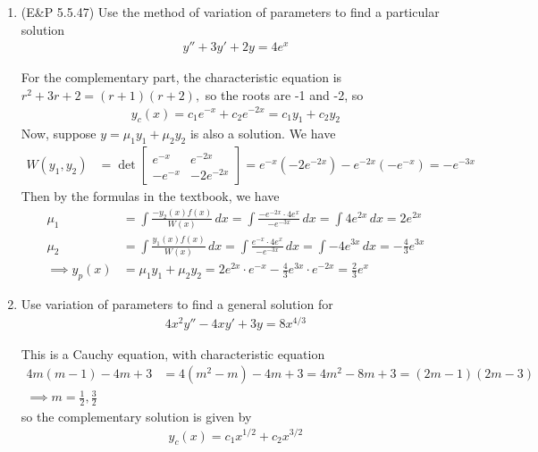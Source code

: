 \documentclass{article}
\begin{document}
\begin{enumerate}
	\item (E\&P 5.5.47) Use the method of variation of parameters to find a particular solution
		\begin{align*}
			y'' + 3y' + 2y = 4e^x
		\end{align*}
		\begin{soln}
			For the complementary part, the characteristic equation is $r^2+3r+2=(r+1)(r+2),$ so the roots are -1 and -2, so
			\begin{align*}
				y_c(x) = c_1e^{-x} + c_2e^{-2x} = c_1y_1 + c_2y_2
			\end{align*}
			Now, suppose $y = \mu_1y_1 + \mu_2y_2$ is also a solution. We have
			\begin{align*}
				W(y_1, y_2) &= \det \begin{bmatrix}
					e^{-x} & e^{-2x} \\ -e^{-x} & -2e^{-2x}
				\end{bmatrix} = e^{-x}(-2e^{-2x}) - e^{-2x}(-e^{-x}) = -e^{-3x}
			\end{align*}
			Then by the formulas in the textbook, we have
			\begin{align*}
				\mu_1 &= \int \frac{-y_2(x) f(x)}{W(x)}\, dx = \int \frac{-e^{-2x} \cdot 4e^x}{-e^{-3x}}\, dx = \int 4e^{2x}\, dx = 2e^{2x} \\
				\mu_2 &= \int \frac{y_1(x)f(x)}{W(x)}\, dx = \int \frac{e^{-x}\cdot 4e^{x}}{-e^{-3x}}\, dx = \int -4e^{3x}\, dx = -\frac{4}{3} e^{3x} \\
				\implies y_p(x) &= \mu_1 y_1 + \mu_2y_2 = 2e^{2x} \cdot e^{-x} - \frac{4}{3}e^{3x}\cdot e^{-2x} = \frac{2}{3} e^x
			\end{align*}
		\end{soln}

	\item Use variation of parameters to find a general solution for
		\begin{align*}
			4x^2y''-4xy'+3y=8x^{4/3}
		\end{align*}
		\begin{soln}
			This is a Cauchy equation, with characteristic equation
			\begin{align*}
				4m(m-1) - 4m + 3 &= 4(m^2-m) - 4m + 3 = 4m^2-8m+3 = (2m-1)(2m-3) \\
				\implies m = \frac{1}{2}, \frac{3}{2}
			\end{align*}
			so the complementary solution is given by
			\begin{align*}
				y_c(x) = c_1x^{1/2} + c_2x^{3/2}
			\end{align*}


\end{soln}
\end{enumerate}
\end{document}

